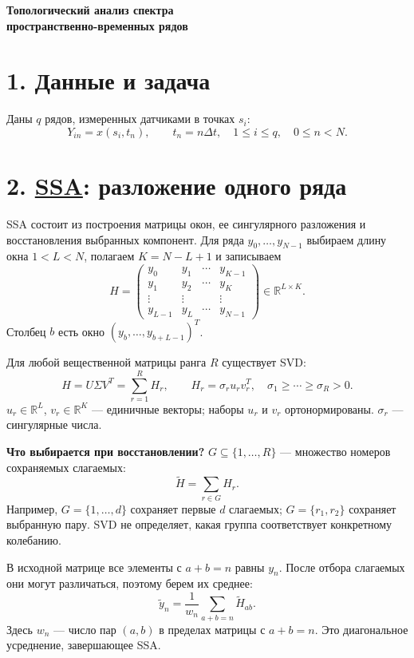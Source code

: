 \documentclass[11pt,a4paper]{article}
\begin{document}
\begin{center}
{\large\bfseries Топологический анализ спектра\\
пространственно-временных рядов}
\end{center}

\section*{1. Данные и задача}
Даны $q$ рядов, измеренных датчиками в точках $s_i$:
\[
 Y_{in}=x(s_i,t_n),\qquad t_n=n\Delta t,\quad
 1\leq i\leq q,\quad 0\leq n<N.
\]

\section*{2. \href{https://www.gistatgroup.com/gus/mssa2.pdf}{SSA}: разложение одного ряда}
SSA состоит из построения матрицы окон,
ее сингулярного разложения и восстановления выбранных компонент.
Для ряда $y_0,\ldots,y_{N-1}$ выбираем длину окна $1<L<N$,
полагаем $K=N-L+1$ и записываем
\[
 H=\begin{pmatrix}
 y_0&y_1&\cdots&y_{K-1}\\
 y_1&y_2&\cdots&y_K\\
 \vdots&\vdots&&\vdots\\
 y_{L-1}&y_L&\cdots&y_{N-1}
 \end{pmatrix}\in\mathbb R^{L\times K}.
\]
Столбец $b$ есть окно $(y_b,\ldots,y_{b+L-1})^T$.

Для любой вещественной матрицы ранга $R$ существует SVD:
\[
 H=U\Sigma V^T=\sum_{r=1}^{R}H_r,\qquad
 H_r=\sigma_ru_rv_r^T,\quad \sigma_1\geq\cdots\geq\sigma_R>0.
\]
$u_r\in\mathbb R^L$, $v_r\in\mathbb R^K$ --- единичные векторы;
наборы $u_r$ и $v_r$ ортонормированы. $\sigma_r$ --- сингулярные числа.

\textbf{Что выбирается при восстановлении?}
$G\subseteq\{1,\ldots,R\}$ --- множество номеров сохраняемых слагаемых:
\[
 \widetilde H=\sum_{r\in G}H_r.
\]
Например, $G=\{1,\ldots,d\}$ сохраняет первые $d$ слагаемых;
$G=\{r_1,r_2\}$ сохраняет выбранную пару. SVD не определяет,
какая группа соответствует конкретному колебанию.

В исходной матрице все элементы с $a+b=n$ равны $y_n$.
После отбора слагаемых они могут различаться, поэтому берем их среднее:
\[
 \widetilde y_n=\frac1{w_n}\sum_{a+b=n}\widetilde H_{ab}.
\]
Здесь $w_n$ --- число пар $(a,b)$ в пределах матрицы с $a+b=n$.
Это диагональное усреднение, завершающее SSA.
\end{document}
